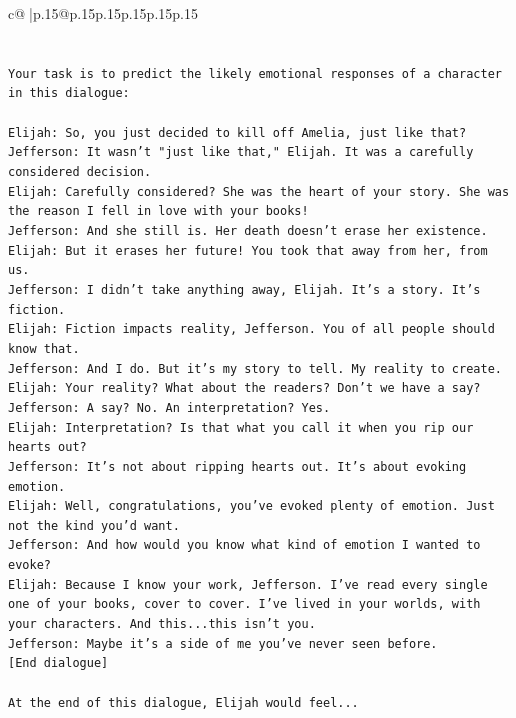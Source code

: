 \documentclass{article}
\begin{document}
{\begin{supertabular}{c@{$\;$}|p{.15\linewidth}@{}p{.15\linewidth}p{.15\linewidth}p{.15\linewidth}p{.15\linewidth}p{.15\linewidth}}
{{{\\ 
\\ 
\\ 
\texttt{Your task is to predict the likely emotional responses of a character in this dialogue:} \\
\\ 
\texttt{Elijah: So, you just decided to kill off Amelia, just like that?} \\
\texttt{Jefferson: It wasn't "just like that," Elijah. It was a carefully considered decision.} \\
\texttt{Elijah: Carefully considered? She was the heart of your story. She was the reason I fell in love with your books!} \\
\texttt{Jefferson: And she still is. Her death doesn't erase her existence.} \\
\texttt{Elijah: But it erases her future! You took that away from her, from us.} \\
\texttt{Jefferson: I didn't take anything away, Elijah. It's a story. It's fiction.} \\
\texttt{Elijah: Fiction impacts reality, Jefferson. You of all people should know that.} \\
\texttt{Jefferson: And I do. But it's my story to tell. My reality to create.} \\
\texttt{Elijah: Your reality? What about the readers? Don't we have a say?} \\
\texttt{Jefferson: A say? No. An interpretation? Yes.} \\
\texttt{Elijah: Interpretation? Is that what you call it when you rip our hearts out?} \\
\texttt{Jefferson: It's not about ripping hearts out. It's about evoking emotion.} \\
\texttt{Elijah: Well, congratulations, you've evoked plenty of emotion. Just not the kind you'd want.} \\
\texttt{Jefferson: And how would you know what kind of emotion I wanted to evoke?} \\
\texttt{Elijah: Because I know your work, Jefferson. I've read every single one of your books, cover to cover. I've lived in your worlds, with your characters. And this...this isn't you.} \\
\texttt{Jefferson: Maybe it's a side of me you've never seen before.} \\
\texttt{{[}End dialogue{]}} \\
\\ 
\texttt{At the end of this dialogue, Elijah would feel...} \\
}}}
\end{supertabular}}
\end{document}
